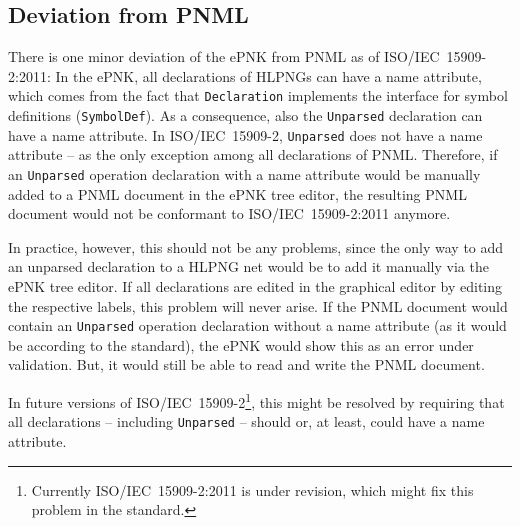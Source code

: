 \subsection{Deviation from PNML}
\label{subsec:user-netlabels}

There is one minor deviation of the ePNK from PNML as of ISO/IEC~15909-2:2011:
In the ePNK, all declarations of HLPNGs can have a name attribute, 
which comes from the fact that {\tt Declaration} implements the interface for
symbol definitions ({\tt SymbolDef}). As a consequence, also the {\tt Unparsed}
declaration can have a name attribute. In ISO/IEC~15909-2, {\tt Unparsed} does
not have a name attribute -- as the only exception among all declarations of
PNML. Therefore, if an {\tt Unparsed} operation declaration with a name
attribute would be manually added to a PNML document in the ePNK tree editor,
the resulting PNML document would not be conformant to  ISO/IEC~15909-2:2011 anymore.

In practice, however, this should not be any problems, since the only
way to add an unparsed declaration to a HLPNG net would be to add it manually
via the ePNK tree editor. If all declarations are edited in the graphical
editor by editing the respective labels, this problem will never arise.
If the PNML document would contain an {\tt Unparsed} operation declaration
without a name attribute (as it would be according to the standard), the
ePNK would show this as an error under validation. But, it would still be able
to read and write the PNML document.

In future versions of ISO/IEC~15909-2\footnote
  {Currently ISO/IEC~15909-2:2011 is under revision, which might fix
   this problem in the standard.}, this might be resolved by requiring that
all declarations -- including {\tt Unparsed} -- should or, at least, could have
a name attribute.
